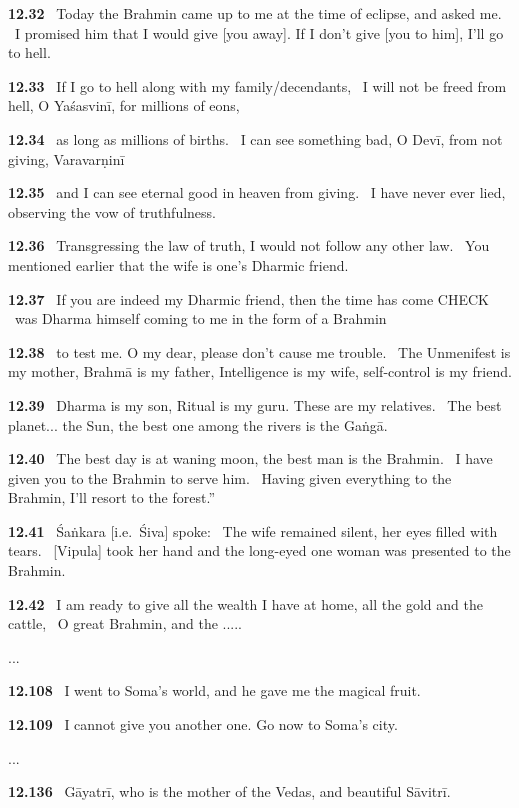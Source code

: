 \documentclass{article}
\begin{document}
\textbf{12.32}%
\ Today the Brahmin came up to me at the time of eclipse, and asked me.%
\ I promised him that I would give [you away]. If I don't give [you to him], I'll go to hell.%


\textbf{12.33}%
\ If I go to hell along with my family/decendants,%
\ I will not be freed from hell, O Yaśasvinī, for millions of eons,%


\textbf{12.34}%
\ as long as millions of births.%
\ I can see something bad, O Devī, from not giving, Varavarṇinī%


\textbf{12.35}%
\ and I can see eternal good in heaven from giving.%
\ I have never ever lied, observing the vow of truthfulness.%


\textbf{12.36}%
\ Transgressing the law of truth, I would not follow any other law.%
\ You mentioned earlier that the wife is one's Dharmic friend.%


\textbf{12.37}%
\ If you are indeed my Dharmic friend, then the time has come CHECK%
\ was Dharma himself coming to me in the form of a Brahmin%


\textbf{12.38}%
\ to test me. O my dear, please don't cause me trouble.%
\ The Unmenifest is my mother, Brahmā is my father, Intelligence is my wife, self-control is my friend.%


\textbf{12.39}%
\ Dharma is my son, Ritual is my guru. These are my relatives.%
\ The best planet... the Sun, the best one among the rivers is the Gaṅgā.%


\textbf{12.40}%
\ The best day is at waning moon, the best man is the Brahmin.%
\ I have given you to the Brahmin to serve him.%
\ Having given everything to the Brahmin, I'll resort to the forest.''%


\textbf{12.41}%
\ Śaṅkara [i.e.\ Śiva] spoke:%
\ The wife remained silent, her eyes filled with tears.%
\ [Vipula] took her hand and the long-eyed one woman was presented to the Brahmin.%


\textbf{12.42}%
\ I am ready to give all the wealth I have at home, all the gold and the cattle,%
\ O great Brahmin, and the .....%


...


\textbf{12.108}%
\ I went to Soma's world, and he gave me the magical fruit.%


\textbf{12.109}%
\ I cannot give you another one. Go now to Soma's city.%


...


\textbf{12.136}%
\ Gāyatrī, who is the mother of the Vedas, and beautiful Sāvitrī.%
\end{document}
